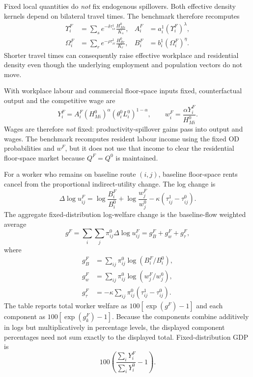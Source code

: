 \documentclass[11pt,a4paper]{article}
\begin{document}
Fixed local quantities do \emph{not} fix endogenous spillovers. Both effective
density kernels depend on bilateral travel times. The benchmark therefore
recomputes
\begin{align}
 \Upsilon_i^F&=\sum_s e^{-\delta\tau_{is}^1}
                    \frac{H_{Ms}^0}{K_s},
 &A_i^F&=a_i^1(\Upsilon_i^F)^\lambda,\\
 \Omega_i^F&=\sum_r e^{-\rho\tau_{ir}^1}
                    \frac{H_{Rr}^0}{K_r},
 &B_i^F&=b_i^1(\Omega_i^F)^\eta.                      \label{eq:fixedspillovers}
\end{align}
Shorter travel times can consequently raise effective workplace and
residential density even though the underlying employment and population
vectors do not move.

With workplace labour and commercial floor-space inputs fixed, counterfactual
output and the competitive wage are
\begin{equation}
 Y_i^F=A_i^F(H_{Mi}^0)^\alpha(\theta_i^0L_i^0)^{1-\alpha},
 \qquad w_i^F=\frac{\alpha Y_i^F}{H_{Mi}^0}.           \label{eq:fixedoutput}
\end{equation}
Wages are therefore \emph{not} fixed: productivity-spillover gains pass into
output and wages. The benchmark recomputes resident labour income using the
fixed OD probabilities and $w^F$, but it does not use that income to clear the
residential floor-space market because $Q^F=Q^0$ is maintained.

For a worker who remains on baseline route $(i,j)$, baseline floor-space rents
cancel from the proportional indirect-utility change. The log change is
\begin{equation}
 \Delta\log u_{ij}^F=
 \log\frac{B_i^F}{B_i^0}
 +\log\frac{w_j^F}{w_j^0}
 -\kappa(\tau_{ij}^1-\tau_{ij}^0).                    \label{eq:fixedrouteutility}
\end{equation}
The aggregate fixed-distribution log-welfare change is the baseline-flow
weighted average
\begin{equation}
 g^F=\sum_i\sum_j\pi_{ij}^0\Delta\log u_{ij}^F
     =g_B^F+g_w^F+g_\tau^F,                            \label{eq:fixedwelfare}
\end{equation}
where
\begin{align}
 g_B^F&=\sum_{ij}\pi_{ij}^0\log(B_i^F/B_i^0),\\
 g_w^F&=\sum_{ij}\pi_{ij}^0\log(w_j^F/w_j^0),\\
 g_\tau^F&=-\kappa\sum_{ij}\pi_{ij}^0
                 (\tau_{ij}^1-\tau_{ij}^0).           \label{eq:fixedcomponents}
\end{align}
The table reports total worker welfare as $100[\exp(g^F)-1]$ and each component
as $100[\exp(g_k^F)-1]$. Because the components combine additively in logs but
multiplicatively in percentage levels, the displayed component percentages
need not sum exactly to the displayed total. Fixed-distribution GDP is
\begin{equation}
 100\left(\frac{\sum_iY_i^F}{\sum_iY_i^0}-1\right).    \label{eq:fixedgdp}
\end{equation}
\end{document}

